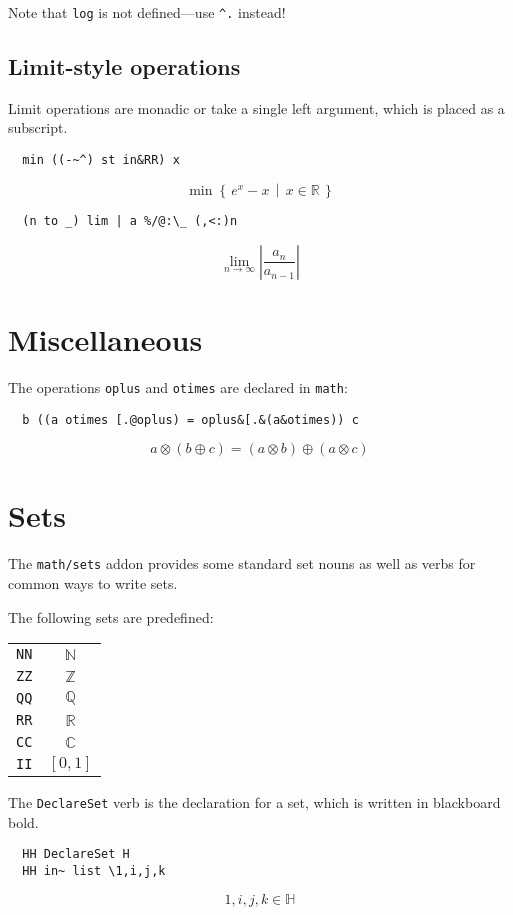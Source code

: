 \documentclass{article}
\begin{document}
Note that \lstinline`log` is not defined---use \lstinline`^.` instead!

\subsection{Limit-style operations}
Limit operations are monadic or take a single left argument, which is
placed as a subscript.
\begin{lstlisting}
  min ((-~^) st in&RR) x
\end{lstlisting}
\[\min \left\{\,e^{x}-x\,\middle|\,x \in \mathbb{R}\,\right\}\]
\begin{lstlisting}
  (n to _) lim | a %/@:\_ (,<:)n
\end{lstlisting}
\[\lim_{n \rightarrow \infty}\left|\frac{a_n}{a_{n-1}}\right|\]

\section{Miscellaneous}
The operations \lstinline`oplus` and \lstinline`otimes` are declared in \lstinline`math`:
\begin{lstlisting}
  b ((a otimes [.@oplus) = oplus&[.&(a&otimes)) c
\end{lstlisting}
\[a \otimes (b \oplus c)=(a \otimes b) \oplus (a \otimes c)\]

\section{Sets}
The \lstinline`math/sets` addon provides some standard set nouns as well as verbs
for common ways to write sets.

The following sets are predefined:
\begin{center}
  \begin{tabular}{lc}
    \lstinline`NN` & $\mathbb{N}$ \\
    \lstinline`ZZ` & $\mathbb{Z}$ \\
    \lstinline`QQ` & $\mathbb{Q}$ \\
    \lstinline`RR` & $\mathbb{R}$ \\
    \lstinline`CC` & $\mathbb{C}$ \\
    \lstinline`II` & $[0,1]$
  \end{tabular}
\end{center}

The \lstinline`DeclareSet` verb is the declaration for a set, which is written in
blackboard bold.
\begin{lstlisting}
  HH DeclareSet H
  HH in~ list \1,i,j,k
\end{lstlisting}
\[1,i,j,k \in \mathbb{H}\]
\end{document}
